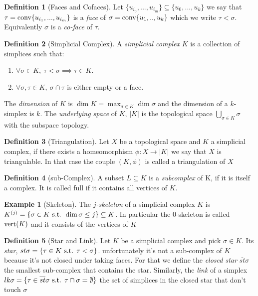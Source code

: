 \documentclass{article}
\newcommand{\conv}{\textmd{conv}}
\newcommand{\vertices}{\textmd{vert}}
\newcommand{\st}{\textmd{ s.t. }}
\theoremstyle{plain}
\theoremstyle{definition}
\newtheorem{definition}{Definition}[section]
\newtheorem{example}{Example}[section]
\theoremstyle{remark}
\begin{document}
	\begin{definition} [Faces and Cofaces]
		Let $ \{u_{i_0},...,u_{i_m} \} \subseteq \{u_0,...,u_k\} $ we say that $ \tau = \conv\{u_{i_1},...,u_{i_m}\} $ is a \emph{face} of $ \sigma = \conv\{u_1,..,u_k\} $ which we write $ \tau < \sigma $. Equivalently $ \sigma $ is a \emph{co-face} of $ \tau $.
	\end{definition}
	
	\begin{definition}[Simplicial Complex]
		A \emph{simplicial complex} $K$ is a collection of simplices such that:
		\begin{enumerate}[label=(S\arabic*)]
			\item $ \forall \sigma \in K, \ \tau < \sigma \implies \tau \in K $. 
			\item $ \forall \sigma,\tau \in K, \ \sigma \cap \tau $ is either empty or a face.
		\end{enumerate}
		
	The \emph{dimension} of $K$ is $ \dim K = \max_{\sigma \in K} \dim \sigma $ and the dimension of a $k$-simplex is $k$.
	The \emph{underlying space} of $K$, $|K|$ is the topological space $ \bigcup_{\sigma \in K} \sigma $ with the subspace topology.
	\end{definition}
\begin{definition}[Triangulation]
	Let $X$ be a topological space and $K$ a simplicial complex, if there exists a homeomorphism $ \phi : X \to |K| $ we say that $X$ is triangulable. In that case the couple $ (K,\phi) $ is called a triangulation of $X$
\end{definition}

	\begin{definition}[sub-Complex]
		A subset $L \subseteq K$ is a \emph{subcomplex} of K, if it is itself a complex. It is called full if it contains all vertices of $K$.
	\end{definition}
	
	\begin{example}[Skeleton]
		The \emph{$j$-skeleton} of a simplicial complex $K$ is $K^{(j)}= \{ \sigma \in K \st \dim\sigma \leq j \} \subseteq K $. In particular the 0-skeleton is called $\vertices(K)$ and it consists of the vertices of $K$
	\end{example}
	
	\begin{definition}[Star and Link]
		Let $K$ be a simplicial complex and pick $ \sigma \in K $. Its \emph{star}, $ st\sigma = \{ \tau \in K \st \tau < \sigma \} $. unfortunately it's not a sub-complex of $K$ because it's not closed under taking faces. For that we define the \emph{closed star }$ \overline{st}\sigma $ the smallest sub-complex that contains the star.
		Similarly, the \emph{link} of a simplex $ lk\sigma = \{ \tau \in \overline{st}\sigma \st \tau \cap \sigma = \emptyset \} $ the set of simplices in the closed star that don't touch $\sigma$
	\end{definition}
	
\end{document}
